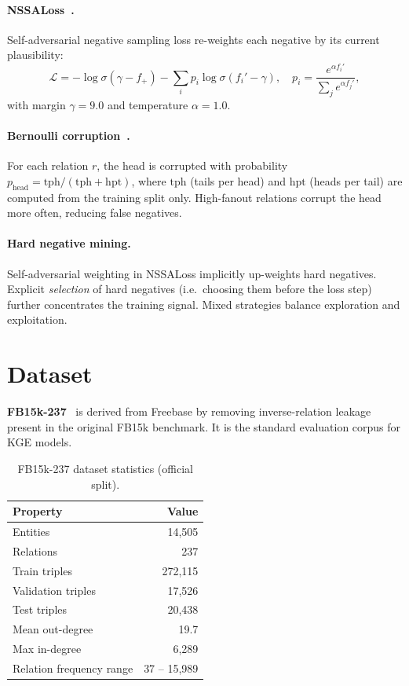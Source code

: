 \documentclass[10pt,twocolumn,letterpaper]{article}
\begin{document}
\paragraph{NSSALoss~\cite{sun2019rotate}.}
Self-adversarial negative sampling loss re-weights each negative by its
current plausibility:
\begin{equation}
\mathcal{L} = -\log\sigma(\gamma - f_+)
             - \textstyle\sum_i p_i \log\sigma(f_i' - \gamma),
\quad
p_i = \frac{e^{\alpha f_i'}}{\sum_j e^{\alpha f_j'}},
\label{eq:nssa}
\end{equation}
with margin $\gamma=9.0$ and temperature $\alpha=1.0$.

\paragraph{Bernoulli corruption~\cite{wang2014knowledge}.}
For each relation $r$, the head is corrupted with probability
$p_{\mathrm{head}} = \mathrm{tph}/(\mathrm{tph}+\mathrm{hpt})$,
where $\mathrm{tph}$ (tails per head) and $\mathrm{hpt}$ (heads per tail)
are computed from the training split only.
High-fanout relations corrupt the head more often, reducing false negatives.

\paragraph{Hard negative mining.}
Self-adversarial weighting in NSSALoss implicitly up-weights hard negatives.
Explicit \emph{selection} of hard negatives (i.e.\ choosing them before the
loss step) further concentrates the training signal. Mixed
strategies balance exploration and exploitation.

\section{Dataset}
\label{sec:dataset}

\textbf{FB15k-237}~\cite{toutanova2015observed} is derived from Freebase by removing
inverse-relation leakage present in the original FB15k benchmark.
It is the standard evaluation corpus for KGE models.

\begin{table}[h]
\centering\small
\caption{FB15k-237 dataset statistics (official split).}
\label{tab:dataset}
\begin{tabular}{@{}lr@{}}
\toprule
Property & Value \\
\midrule
Entities & 14,505 \\
Relations & 237 \\
Train triples & 272,115 \\
Validation triples & 17,526 \\
Test triples & 20,438 \\
Mean out-degree & 19.7 \\
Max in-degree & 6,289 \\
Relation frequency range & 37 -- 15,989 \\
\bottomrule
\end{tabular}
\end{table}
\end{document}
